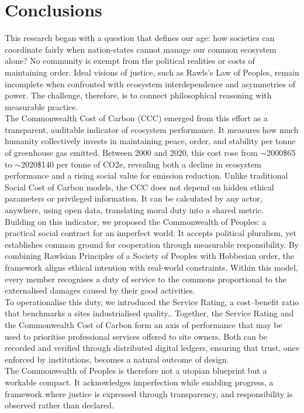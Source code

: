 \section{Conclusions}

This research began with a question that defines our age: how societies can coordinate fairly when nation-states cannot manage our common ecosystem alone?
No community is exempt from the political realities or costs of maintaining order.
Ideal visions of justice, such as Rawls’s Law of Peoples, remain incomplete when confronted with ecosystem interdependence and asymmetries of power.
The challenge, therefore, is to connect philosophical reasoning with measurable practice.\\

The Commonwealth Cost of Carbon (CCC) emerged from this effort as a transparent, auditable indicator of ecosystem performance.
It measures how much humanity collectively invests in maintaining peace, order, and stability per tonne of greenhouse gas emitted.
Between 2000 and 2020, this cost rose from $\sim$2000\$65 to $\sim$2020\$140 per tonne of CO2e, revealing both a decline in ecosystem performance and a rising social value for emission reduction.
Unlike traditional Social Cost of Carbon models, the CCC does not depend on hidden ethical parameters or privileged information.
It can be calculated by any actor, anywhere, using open data, translating moral duty into a shared metric.\\

Building on this indicator, we proposed the Commonwealth of Peoples: a practical social contract for an imperfect world.
It accepts political pluralism, yet establishes common ground for cooperation through measurable responsibility.
By combining Rawlsian Principles of a Society of Peoples with Hobbesian order, the framework aligns ethical intention with real-world constraints.
Within this model, every member recognises a duty of service to the commons proportional to the externalised damages caused by their good activities.\\

To operationalise this duty, we introduced the Service Rating, a cost–benefit ratio that benchmarks a sites industrialised quality..
Together, the Service Rating and the Commonwealth Cost of Carbon form an axis of performance that may be used to prioritise professional services offered to site owners.
Both can be recorded and verified through distributed digital ledgers, ensuring that trust, once enforced by institutions, becomes a natural outcome of design.\\

The Commonwealth of Peoples is therefore not a utopian blueprint but a workable compact.
It acknowledges imperfection while enabling progress, a framework where justice is expressed through transparency, and responsibility is observed rather than declared.\\

